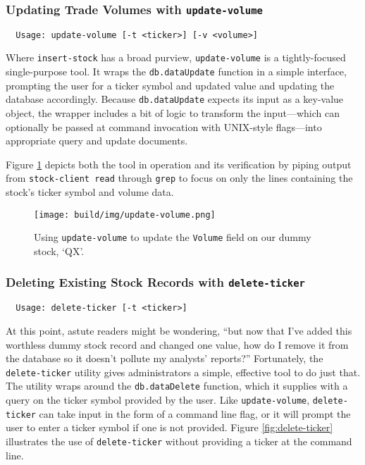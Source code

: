 \documentclass[
11pt,
titlepage,
]{article}
\begin{document}
\subsubsection{Updating Trade Volumes with \texttt{update-volume}}

\begin{lstlisting}
  Usage: update-volume [-t <ticker>] [-v <volume>]
\end{lstlisting}

Where \texttt{insert-stock} has a broad purview, \texttt{update-volume} is a
tightly-focused single-purpose tool. It wraps the \texttt{db.dataUpdate}
function in a simple interface, prompting the user for a ticker symbol and
updated value and updating the database accordingly. Because
\texttt{db.dataUpdate} expects its input as a key-value object, the wrapper
includes a bit of logic to transform the input---which can optionally be passed
at command invocation with UNIX-style flags---into appropriate query and update
documents.

Figure \ref{fig:update-volume} depicts both the tool in operation and its
verification by piping output from \texttt{stock-client read} through
\texttt{grep} to focus on only the lines containing the stock's ticker symbol
and volume data.

\begin{figure}[tbp]
  \texttt{[image: build/img/update-volume.png]}
  \caption{Using \texttt{update-volume} to update the \texttt{Volume} field on
    our dummy stock, `QX'.}
  \label{fig:update-volume}
\end{figure}

\subsubsection{Deleting Existing Stock Records with \texttt{delete-ticker}}

\begin{lstlisting}
  Usage: delete-ticker [-t <ticker>]
\end{lstlisting}

At this point, astute readers might be wondering, ``but now that I've added this
worthless dummy stock record and changed one value, how do I remove it from the
database so it doesn't pollute my analysts' reports?'' Fortunately, the
\texttt{delete-ticker} utility gives administrators a simple, effective tool to
do just that. The utility wraps around the \texttt{db.dataDelete} function,
which it supplies with a query on the ticker symbol provided by the user. Like
\texttt{update-volume}, \texttt{delete-ticker} can take input in the form of a
command line flag, or it will prompt the user to enter a ticker symbol if one is
not provided. Figure \ref{fig:delete-ticker} illustrates the use of
\texttt{delete-ticker} without providing a ticker at the command line.
\end{document}
